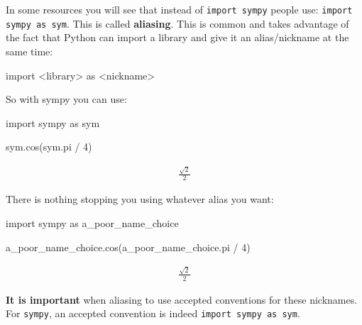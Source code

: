 In some resources you will see that instead of \texttt{import sympy} people use:
\texttt{import sympy as sym}. This is called \textbf{aliasing}. This is common and takes
advantage of the fact that Python can import a library and give it an
alias/nickname at the same time:

\begin{api}
import <library> as <nickname>
\end{api}


So with sympy you can use:




\begin{pyin}
import sympy as sym

sym.cos(sym.pi / 4)
\end{pyin}




\begin{equation*}
\begin{split}\displaystyle \frac{\sqrt{2}}{2}\end{split}
\end{equation*}




There is nothing stopping you using whatever alias you want:




\begin{pyin}
import sympy as a_poor_name_choice

a_poor_name_choice.cos(a_poor_name_choice.pi / 4)
\end{pyin}




\begin{equation*}
\begin{split}\displaystyle \frac{\sqrt{2}}{2}\end{split}
\end{equation*}

\begin{note}
\textbf{It is important} when aliasing to use accepted conventions for these
nicknames. For \texttt{sympy}, an accepted convention is indeed \texttt{import sympy as sym}.
\end{note}
